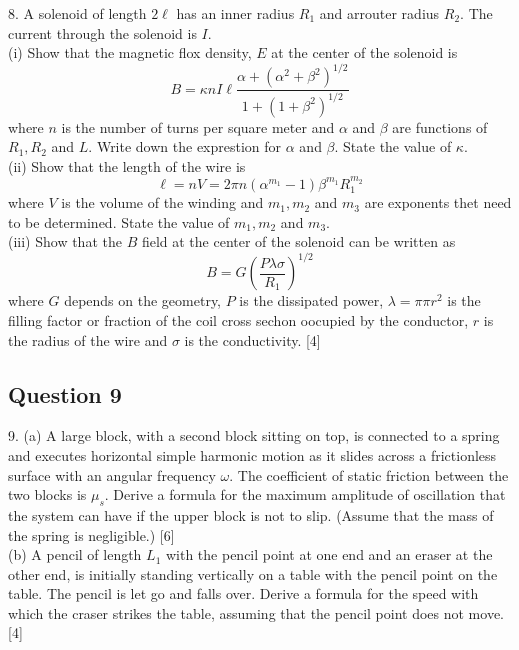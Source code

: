 8. A solenoid of length $2 \ell$ has an inner radius $R_{1}$ and arrouter radius $R_{2}$. The current through the solenoid is $I$. \\
(i) Show that the magnetic flox density, $E$ at the center of the solenoid is
$$
B=\kappa n I \ell \frac{\alpha+\left(\alpha^{2}+\beta^{2}\right)^{1 / 2}}{1+\left(1+\beta^{2}\right)^{1 / 2}}
$$
where $n$ is the number of turns per square meter and $\alpha$ and $\beta$ are functions of $R_{1}, R_{2}$ and $L$. Write down the exprestion for $\alpha$ and $\beta$. State the value of $\kappa$. \\
(ii) Show that the length of the wire is
$$
\ell=n V=2 \pi n\left(\alpha^{m_{1}}-1\right) \beta^{m_{1}} R_{1}^{m_{2}}
$$
where $V$ is the volume of the winding and $m_{1}, m_{2}$ and $m_{3}$ are exponents thet need to be determined. State the value of $m_{1}, m_{2}$ and $m_{3}$. \\
(iii) Show that the $B$ field at the center of the solenoid can be written as
$$
B=G\left(\frac{P \lambda \sigma}{R_{1}}\right)^{1 / 2}
$$
where $G$ depends on the geometry, $P$ is the dissipated power, $\lambda=\pi \pi r^{2}$ is the filling factor or fraction of the coil cross sechon oocupied by the conductor, $r$ is the radius of the wire and $\sigma$ is the conductivity. [4]

\subsection{Question 9}
9. (a) A large block, with a second block sitting on top, is connected to a spring and executes horizontal simple harmonic motion as it slides across a frictionless surface with an angular frequency $\omega$. The coefficient of static friction between the two blocks is $\mu_{s}$. Derive a formula for the maximum amplitude of oscillation that the system can have if the upper block is not to slip. (Assume that the mass of the spring is negligible.) [6] \\
(b) A pencil of length $L_{1}$ with the pencil point at one end and an eraser at the other end, is initially standing vertically on a table with the pencil point on the table. The pencil is let go and falls over. Derive a formula for the speed with which the craser strikes the table, assuming that the pencil point does not move. [4]


